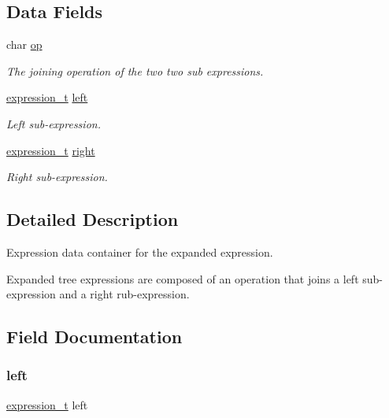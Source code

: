 \subsection*{Data Fields}
\begin{DoxyCompactItemize}
\item 
char \hyperlink{structexpression__data__tree_a3d5c605540ca9e9431799d5a79cb94b0}{op}
\begin{DoxyCompactList}\small\item\em The joining operation of the two two sub expressions. \end{DoxyCompactList}\item 
\hyperlink{expression__lite_8h_ac198bce62637e5d742da0218d544a7ac}{expression\+\_\+t} \hyperlink{structexpression__data__tree_a46f4a906ae330c3598e899fc77c3d17a}{left}
\begin{DoxyCompactList}\small\item\em Left sub-\/expression. \end{DoxyCompactList}\item 
\hyperlink{expression__lite_8h_ac198bce62637e5d742da0218d544a7ac}{expression\+\_\+t} \hyperlink{structexpression__data__tree_ad77c9db9f894879970e67e6cb081db60}{right}
\begin{DoxyCompactList}\small\item\em Right sub-\/expression. \end{DoxyCompactList}\end{DoxyCompactItemize}


\subsection{Detailed Description}
Expression data container for the expanded expression. 

Expanded tree expressions are composed of an operation that joins a left sub-\/expression and a right rub-\/expression. 

\subsection{Field Documentation}
\mbox{\label{structexpression__data__tree_a46f4a906ae330c3598e899fc77c3d17a}} 
\subsubsection{\texorpdfstring{left}{left}}
{\footnotesize\ttfamily \hyperlink{expression__lite_8h_ac198bce62637e5d742da0218d544a7ac}{expression\+\_\+t} left}



